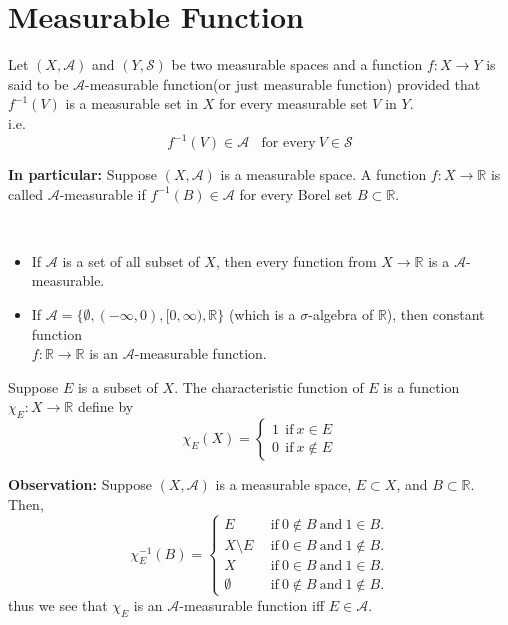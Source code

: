 \section{Measurable Function}
\begin{definition}
    Let $\left( X,\mathcal{A} \right) $ and $\left( Y,\mathcal{S} \right) $ be two measurable spaces and a function $f:X \to Y$ is said to be $\mathcal{A}$-measurable function(or just measurable function) provided that  $f^{-1}(V)$ is a measurable set in $X$ for every measurable set $V$  in $Y$.\\
    i.e.
    \[
        f^{-1}(V)\in\mathcal{A} \ \ \  \ \text{for every}\ V\in\mathcal{S}
    \]
\end{definition}
\textbf{In particular:} Suppose $(X,\mathcal{A})$ is a measurable space. A function  $f:X\to\mathds{R}$ is called $\mathcal{A}$-measurable if  $f^{-1}(B)\in\mathcal{A}$ for every Borel set $B\subset \mathds{R}$.

\begin{example}
    \
    \begin{itemize}
        \item If $\mathcal{A}$ is a set of all subset of $X$, then every function from  $X\to\mathds{R}$ is a $\mathcal{A}$-measurable.
        \item If $\mathcal{A}=\{\emptyset , (-\infty,0), [0,\infty),\mathds{R}\}$ (which is a $\sigma$-algebra of  $\mathds{R}$), then constant function \\
            $f:\mathds{R}\to\mathds{R}$ is an $\mathcal{A}$-measurable function.
    \end{itemize}
\end{example}

\begin{definition}
    Suppose $E$ is a subset of  $X$. The characteristic function of $E$ is a function  $\chi_{E}:X\to\mathds{R}$ define by 
    \begin{equation*}
        \chi_{E}(X)=
        \begin{cases}
            1 \ \ \text{if}\ x\in E \\
            0 \ \ \text{if}\ x\notin E
        \end{cases}
    \end{equation*}
\end{definition}
\textbf{Observation:} Suppose $(X,\mathcal{A})$ is a measurable space,  $E\subset X$, and $B\subset\mathds{R}$. Then,
\[
    \chi_E^{-1}(B)=
    \begin{cases}
        E \ \ &\text{if}\ 0\notin B\ \text{and}\ 1\in B.\\ 
        X\setminus E \ \ &\text{if}\ 0\in B\ \text{and}\ 1\notin B.\\ 
        X \ \ &\text{if}\ 0\in B\ \text{and}\ 1\in B.\\ 
        \emptyset \ \ &\text{if}\ 0\notin B\ \text{and}\ 1\notin B.
    \end{cases}
\]
thus we see that $\chi_E$ is an  $\mathcal{A}$-measurable function iff  $E\in\mathcal{A}$.

